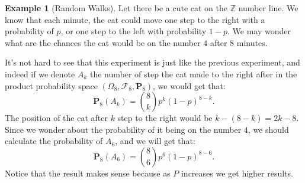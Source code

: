 \documentclass[11pt,a4paper]{article}
\theoremstyle{definition}
\newtheorem{example}{Example}[section]
\theoremstyle{plain}
\newcommand{\Z}{\mathbb{Z}}
\begin{document}
  \begin{example}[Random Walks]
    Let there be a cute cat on the $\Z$ number line. 
    We know that each minute, the cat could move one step to the right with
    a probability of $p$, or one step to the left with probability $1-p$.
    We may wonder what are the chances the cat would be on the number $4$
    after $8$ minutes.

    It's not hard to see that this experiment is just like the previous
    experiment, and indeed if we denote $A_k$ the number of step the cat
    made to the right after in the product probability space 
    $(\Omega_8, \mathcal F_8, \mathbf P_8)$, we would get that:
    \[
      \mathbf P_8(A_k) = \binom{8}{k} p^k (1-p)^{8-k}.
    \]
    The position of the cat after $k$ step to the right would be 
    $k - (8 - k) = 2k - 8$. 
    Since we wonder about the probability of it being on the number $4$,
    we should calculate the probability of $A_6$, and we will get that:
    \[
      \mathbf{P}_{8}(A_{6}) = {\binom{8}{6}} p^{6} (1-p)^{8-6}.
    \]
    Notice that the result makes sense because as $P$ increases we get higher
    results.
  \end{example}
\end{document}
